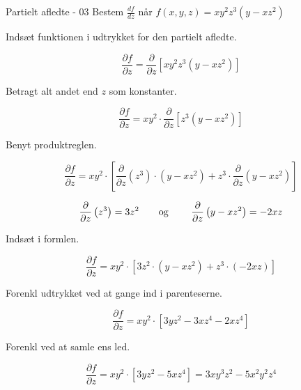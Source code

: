 \documentclass{article}
\begin{document}
\begin{exercise}{Partielt afledte - 03}
Bestem $\frac{df}{dz}$ når $f(x,y,z) = xy^2z^3\left(y - xz^2\right)$


\hint
Indsæt funktionen i udtrykket for den partielt afledte.

\hint

\[
\frac{\partial f}{\partial z} = \frac{\partial }{\partial z} \left[xy^2z^3\left(y - xz^2\right)\right]
\]

\hint
Betragt alt andet end $z$ som konstanter.

\hint
\[
\frac{\partial f}{\partial z} = xy^2 \cdot \frac{\partial }{\partial z} \left[ z^3\left(y - xz^2 \right) \right]
\]

\hint

Benyt produktreglen.

\hint
\[
\frac{\partial f}{\partial z} = xy^2 \cdot \left[\frac{\partial }{\partial z}\left(z^3 \right) \cdot \left( y - xz^2 \right) + z^3 \cdot \frac{\partial}{\partial z} \left(y - xz^2\right) \right]
\]

\hint
\[\frac{\partial }{\partial z} \left(z^3\right) = 3z^2 \textrm{\qquad og \qquad} \frac{\partial }{\partial z} \left(y - xz^2\right) = -2xz
\]

\hint
Indsæt i formlen.

\hint
\[
\frac{\partial f}{\partial z} = xy^2 \cdot \left[3z^2 \cdot \left( y - xz^2 \right) + z^3 \cdot (-2xz) \right]
\]

\hint
Forenkl udtrykket ved at gange ind i parenteserne.

\hint
\[
\frac{\partial f}{\partial z} = xy^2 \cdot \left[3yz^2 - 3xz^4 - 2xz^4 \right]
\]

\hint
Forenkl ved at samle ens led.

\hint
\[
\frac{\partial f}{\partial z} = xy^2 \cdot \left[3yz^2 - 5xz^4\right] = 3xy^3z^2 - 5x^2y^2z^4
\]

\end{exercise}

\newpage
\end{document}
